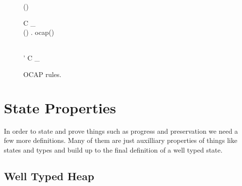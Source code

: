 \begin{figure}
  {\ocap{(\AnyRefType{})}}

  \RuleSpace{}

  {\ocap(\CellType)}

  \RuleSpace{}

  { \andalso C \vdash_{\ocap}  \\
  \forall () \in {}. \: ocap(\sigma)}
  {}

  \RuleSpace{}

  { \\
  \tau' \stof \tau}
  {C \vdash_{\ocap} }
  \caption{\RACL{} OCAP rules.}
  \label{fig:ocap_typing}
\end{figure}


\section{State Properties}
\label{sec:properties}

In order to state and prove things such as progress and preservation we need a few more
definitions. Many of them are just auxilliary properties of things like states
and types and build up to the final definition of a well typed state.

\subsection{Well Typed Heap}%
\label{sub:well_typed_heap}

